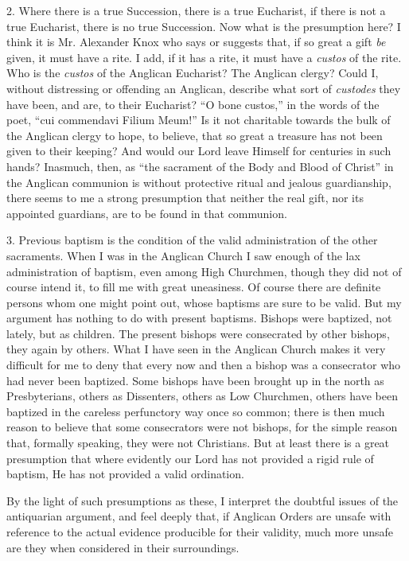 2. Where there is a true Succession, there is a true Eucharist, if
there is not a true Eucharist, there is no true Succession. Now what
is the presumption here? I think it is Mr. Alexander Knox who says or
suggests that, if so great a gift \emph{be} given, it must have a
rite. I add, if it has a rite, it must have a \emph{custos} of the
rite. Who is the \emph{custos} of the Anglican Eucharist? The Anglican
clergy? Could I, without distressing or offending an Anglican,
describe what sort of \emph{custodes} they have been, and are, to
their Eucharist? ``O bone custos,'' in the words of the poet,
``cui commendavi Filium Meum!'' Is it not charitable towards
the bulk of the Anglican clergy to hope, to believe, that so great a
treasure has not been given to their keeping? And would our Lord leave
Himself for centuries in such hands? Inasmuch, then, as ``the
sacrament of the Body and Blood of Christ'' in the Anglican
communion is without protective ritual and jealous guardianship, there
seems to me a strong presumption that neither the real gift, nor its
appointed guardians, are to be found in that communion.

3. Previous baptism is the condition of the valid administration of
the other sacraments. When I was in the Anglican Church I saw enough
of the lax administration of baptism, even among High Churchmen,
though they did not of course intend it, to fill me with great
uneasiness. Of course there are definite persons whom one might
point out, whose baptisms are sure to be valid. But my argument has
nothing to do with present baptisms. Bishops were baptized, not
lately, but as children. The present bishops were consecrated by other
bishops, they again by others. What I have seen in the Anglican Church
makes it very difficult for me to deny that every now and then a
bishop was a consecrator who had never been baptized. Some bishops
have been brought up in the north as Presbyterians, others as
Dissenters, others as Low Churchmen, others have been baptized in the
careless perfunctory way once so common; there is then much reason to
believe that some consecrators were not bishops, for the simple reason
that, formally speaking, they were not Christians. But at least there
is a great presumption that where evidently our Lord has not provided
a rigid rule of baptism, He has not provided a valid ordination.

By the light of such presumptions as these, I interpret the
doubtful issues of the antiquarian argument, and feel deeply that, if
Anglican Orders are unsafe with reference to the actual evidence
producible for their validity, much more unsafe are they when
considered in their surroundings.


